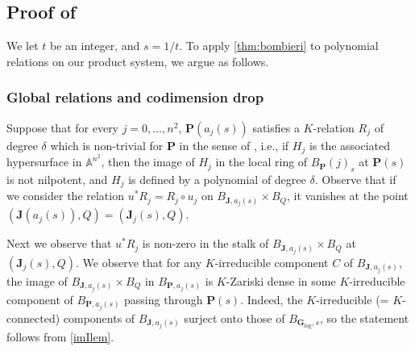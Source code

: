 \documentclass[10pt]{article}
\numberwithin{equation}{section}
\theoremstyle{plain}
\theoremstyle{definition}
\theoremstyle{remark}
\begin{document}
\subsection{Proof of }

We let $t$ be an integer, and $s = 1/t$. To apply \autoref{thm:bombieri} to polynomial relations on our product system, we argue as follows.

\subsubsection{Global relations and codimension drop} 
\label{globalrelcodimdropsec}


Suppose that for every $j = 0, \hdots, n^2$, $\mathbf{P}(a_{j}(s))$ satisfies a $K$-relation $R_{j}$ of degree $\delta$ which is non-trivial for $\mathbf{P}$ in the sense of , i.e., if $H_{j}$ is the associated hypersurface in $\mathbb{A}^{n^2}$, then the image of $H_{j}$ in the local ring of $B_{\mathbf{P}}(j)_{s}$ at $\mathbf{P}(s)$ is not nilpotent, and $H_{j}$ is defined by a polynomial of degree $\delta$. Observe that if we consider the relation $u^{*} R_{j} = R_{j} \circ u_{j}$ on $B_{\mathbf{J},a_{j}(s)} \times B_{Q}$, it vanishes at the point $(\mathbf{J}(a_{j}(s)), Q) = (\mathbf{J}_{j}(s), Q)$. 


Next we observe that $u^{*} R_{j}$ is non-zero in the stalk of $B_{\mathbf{J},a_{j}(s)} \times B_{Q}$ at $(\mathbf{J}_{j}(s), Q)$. We observe that for any $K$-irreducible component $C$ of $B_{\mathbf{J},a_{j}(s)}$, the image of $B_{\mathbf{J}, a_{j}(s)} \times B_{Q}$ in $B_{\mathbf{P}, a_{j}(s)}$ is $K$-Zariski dense in some $K$-irreducible component of $B_{\mathbf{P}, a_{j}(s)}$ passing through $\mathbf{P}(s)$. Indeed, the $K$-irreducible (= $K$-connected) components of $B_{\mathbf{J}, a_{j}(s)}$ surject onto those of $B_{\mathbf{G}_{\operatorname{log}}, s}$, so the statement follows from \autoref{imIlem}.
\end{document}
